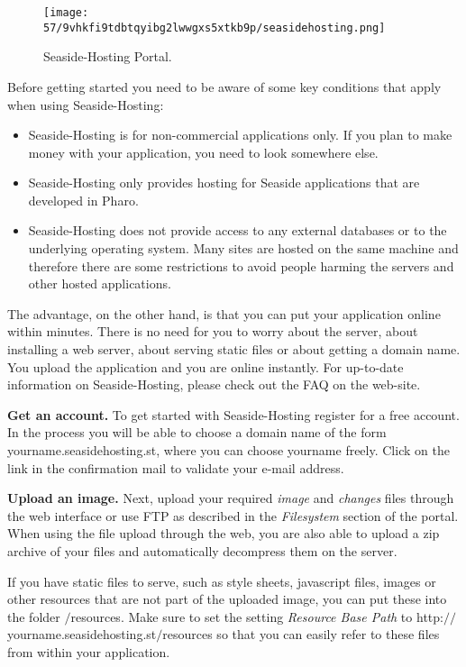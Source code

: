 \documentclass[a4paper,10pt,twoside]{book}
\newcommand{\ct}[1]{{\small\ttfamily\textup{#1}}}
\begin{document}
\begin{figure}[h!tbp]
	\begin{center}
		\texttt{[image: 57/9vhkfi9tdbtqyibg2lwwgxs5xtkb9p/seasidehosting.png]}
		\caption{Seaside-Hosting Portal.\label{book:advanced:deployment:deploymentseasidehosting:deploymentseasidehosting}}
	\end{center}
\end{figure}


Before getting started you need to be aware of some key conditions that apply when using Seaside-Hosting:

\begin{itemize}
\item  Seaside-Hosting is for non-commercial applications only. If you plan to make money with your application, you need to look somewhere else.
\item  Seaside-Hosting only provides hosting for Seaside applications that are developed in Pharo.
\item  Seaside-Hosting does not provide access to any external databases or to the underlying operating system. Many sites are hosted on the same machine and therefore there are some restrictions to avoid people harming the servers and other hosted applications.
\end{itemize}

The advantage, on the other hand, is that you can put your application online within minutes. There is no need for you to worry about the server, about installing a web server, about serving static files or about getting a domain name. You upload the application and you are online instantly. For up-to-date information on Seaside-Hosting, please check out the FAQ on the web-site.

\textbf{Get an account.} To get started with Seaside-Hosting register for a free account. In the process you will be able to choose a domain name of the form \ct{yourname.seasidehosting.st}, where you can choose \ct{yourname} freely. Click on the link in the confirmation mail to validate your e-mail address.

\textbf{Upload an image.} Next, upload your required \textit{image} and \textit{changes} files through the web interface or use FTP as described in the \textit{Filesystem} section of the portal. When using the file upload through the web, you are also able to upload a zip archive of your files and automatically decompress them on the server.

If you have static files to serve, such as style sheets, javascript files, images or other resources that are not part of the uploaded image, you can put these into the folder \ct{$/$resources}. Make sure to set the setting \textit{Resource Base Path}  to \ct{http:$/$$/$yourname.seasidehosting.st$/$resources} so that you can easily refer to these files from within your application.
\end{document}
